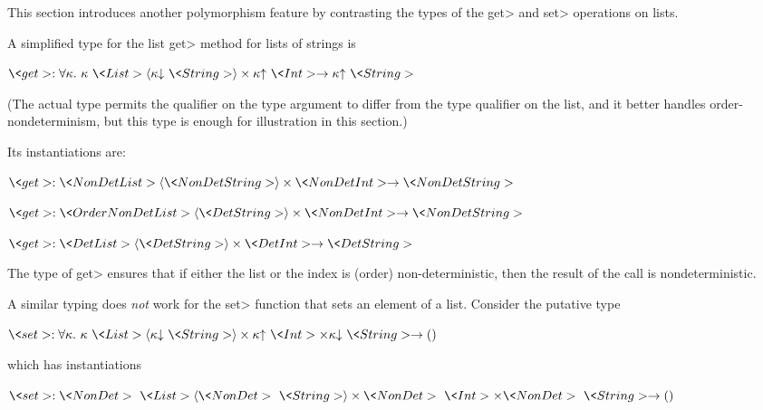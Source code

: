 This section introduces another polymorphism feature by contrasting the
types of the \<get> and \<set> operations on lists.

A simplified type for the list \<get> method for lists of strings is

$\<get> : \forallt{\kappa} \kappa\ \<List>\angles{\down{\kappa}\ \<String>} \times \up{\kappa}\ \<Int> \rightarrow \up{\kappa}\ \<String>$

\noindent
(The actual type permits the qualifier on the type argument to differ
from the type qualifier on the list, and it better handles
order-nondeterminism, but this type is enough for illustration in this section.)

Its instantiations are:

$\<get> : \<NonDet List>\angles{\<NonDet String>} \times \<NonDet Int> \rightarrow \<NonDet String>$

$\<get> : \<OrderNonDet List>\angles{\<Det String>} \times \<NonDet Int> \rightarrow \<NonDet String>$

$\<get> : \<Det List>\angles{\<Det String>} \times \<Det Int> \rightarrow \<Det String>$

\noindent
The type of \<get> ensures that if either the list or the index is (order)
non-deterministic, then the result of the call is nondeterministic.

% 

A similar typing does \emph{not} work for the \<set> function that sets an
element of a list.  Consider the putative type

$\<set> : \forallt{\kappa} \kappa\ \<List>\angles{\down{\kappa}\ \<String>} \times \up{\kappa}\ \<Int> \times \down{\kappa}\ \<String> \rightarrow ()$

\noindent
which has instantiations

$\<set> : \<NonDet>\ \<List>\angles{\<NonDet>\ \<String>} \times \<NonDet>\ \<Int> \times \<NonDet>\ \<String> \rightarrow ()$

